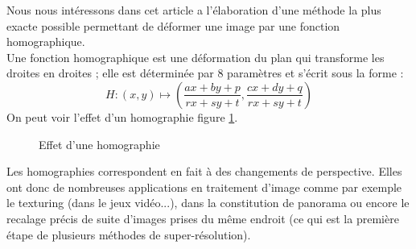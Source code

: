 



	Nous nous intéressons dans cet article a l'élaboration d'une méthode la plus exacte possible permettant de déformer une image par une fonction homographique. \\
 	Une fonction homographique est une déformation du plan qui transforme les droites en droites ; elle est déterminée par 8 paramètres et s'écrit sous la forme :
	\[H : (x,y)\mapsto\left( \frac{ax+by+p}{rx+sy+t},\frac{cx+dy+q}{rx+sy+t}\right)\] 
On peut voir l'effet d'un homographie figure \ref{effethom}.\\

 \begin{figure}
 
   \centering
    \arrowPDP 
   \caption{Effet d'une homographie}
\label{effethom}
 \end{figure}

	Les homographies correspondent en fait à des changements de perspective. Elles ont donc de nombreuses applications en traitement d'image comme par exemple le texturing (dans le jeux vidéo...), dans la constitution de panorama ou encore le recalage précis de suite d'images prises du même endroit (ce qui est la première étape de plusieurs méthodes de super-résolution).


